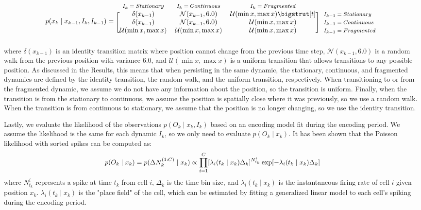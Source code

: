 \documentclass[9pt,lineno]{elife}
\begin{document}
\begin{equation*}
  p(x_{k} \mid x_{k-1}, I_{k}, I_{k-1}) = 
  \begin{blockarray}{*{3}{c} l}
    \begin{block}{*{3}{>{$\footnotesize}c<{$}} l}
      $I_{k} = Stationary$ & $I_{k} = Continuous$ & $I_{k} = Fragmented$ \\
    \end{block}
    \begin{block}{[*{3}{c}]>{$\footnotesize}l<{$}}
      \delta(x_{k-1}) & \mathcal{N}(x_{k-1}, 6.0) & \mathcal{U}(\min x, \max x) \bigstrut[t]& $I_{k-1} = Stationary$ \\
      \delta(x_{k-1}) & \mathcal{N}(x_{k-1}, 6.0)  & \mathcal{U}(\min x, \max x) & $I_{k-1} = Continuous$ \\
      \mathcal{U}(\min x, \max x) & \mathcal{U}(\min x, \max x) & \mathcal{U}(\min x, \max x) & $I_{k-1} = Fragmented$ \\
    \end{block}
  \end{blockarray}
\end{equation*}
where $\delta(x_{k-1})$ is an identity transition matrix where position cannot change from the previous time step, $\mathcal{N}(x_{k-1}, 6.0)$ is a random walk from the previous position with variance 6.0, and $\mathcal{U}(\min x, \max x)$ is a uniform transition that allows transitions to any possible position. As discussed in the Results, this means that when persisting in the same dynamic, the stationary, continuous, and fragmented dynamics are defined by the identity transition, the random walk, and the uniform transition, respectively. When transitioning to or from the fragmented dynamic, we assume we do not have any information about the position, so the transition is uniform. Finally, when the transition is from the stationary to continuous, we assume the position is spatially close where it was previously, so we use a random walk. When the transition is from continuous to stationary, we assume that the position is no longer changing, so we use the identity transition.

Lastly, we evaluate the likelihood of the observations $p(O_{k} \mid x_{k}, I_{k})$ based on an encoding model fit during the encoding period. We assume the likelihood is the same for each dynamic $I_k$, so we only need to evaluate $p(O_{k} \mid x_{k})$. It has been shown \citep{ZhangInterpretingNeuronalPopulation1998, BrownStatisticalParadigmNeural1998} that the Poisson likelihood with sorted spikes can be computed as:
$$
p(O_{k} \mid x_{k}) = p(\Delta N_{k}^{(1:C)} \mid x_{k}) \propto
\prod^{C}_{i=1} [\lambda_{i}(t_{k} \mid x_{k})\Delta_{k}]^{N_{t_{k}}^{i}} \\
    \exp[-\lambda_{i}(t_{k} \mid x_{k})\Delta_{k}]
$$
where $N_{t_{k}}^{i}$ represents a spike at time $t_k$ from cell $i$, $\Delta_k$ is the time bin size, and $\lambda_{i}(t_{k} \mid x_{k})$ is the instantaneous firing rate of cell $i$ given position $x_{k}$. $\lambda_{i}(t_{k} \mid x_{k})$ is the "place field" of the cell, which can be estimated by fitting a generalized linear model to each cell's spiking during the encoding period.
\end{document}

